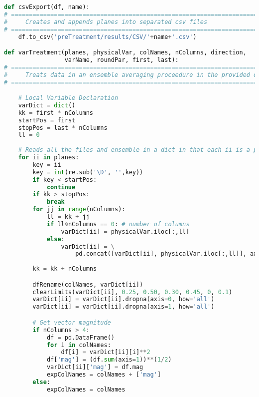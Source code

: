 \begin{lstlisting}[language=python]
def csvExport(df, name):
# =============================================================================
#     Creates and appends planes into separated csv files
# =============================================================================
    df.to_csv('preTreatment/results/CSV/'+name+'.csv')

def varTreatment(planes, physicalVar, colNames, nColumns, direction,
                 varName, roundPar, first, last):
# =============================================================================
#     Treats data in an ensemble averaging proceedure in the provided direction
# =============================================================================

    # Local Variable Declaration
    varDict = dict()
    kk = first * nColumns
    startPos = first
    stopPos = last * nColumns
    ll = 0
  
    # Reads all the files and ensemble in a dict in that each ii is a plane
    for ii in planes:
        key = ii
        key = int(re.sub('\D', '',key))
        if key < startPos:
            continue
        if kk > stopPos: 
            break
        for jj in range(nColumns):
            ll = kk + jj
            if ll%nColumns == 0: # number of columns
                varDict[ii] = physicalVar.iloc[:,ll]
            else:
                varDict[ii] = \
                    pd.concat([varDict[ii], physicalVar.iloc[:,ll]], axis=1)
                    
        kk = kk + nColumns

        dfRename(colNames, varDict[ii])
        clearLimits(varDict[ii], 0.25, 0.50, 0.30, 0.45, 0, 0.1)
        varDict[ii] = varDict[ii].dropna(axis=0, how='all')
        varDict[ii] = varDict[ii].dropna(axis=1, how='all')

        # Get vector magnitude
        if nColumns > 4:
            df = pd.DataFrame()
            for i in colNames:
                df[i] = varDict[ii][i]**2
            df['mag'] = (df.sum(axis=1))**(1/2)
            varDict[ii]['mag'] = df.mag
            expColNames = colNames + ['mag']
        else:
            expColNames = colNames
            

\end{lstlisting}
